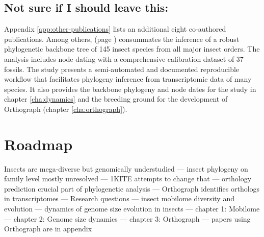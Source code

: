 \subsection{Not sure if I should leave this:}

Appendix \ref{app:other-publications} lists an additional eight
co-authored publications. Among others, \citet{Misof2014} (page
\pageref{app:Misof2014}) consummates the inference of a robust
phylogenetic backbone tree of 145 insect species from all major insect
orders. The analysis includes node dating with a comprehensive
calibration dataset of 37 fossils. The study presents a semi-automated
and documented reproducible workflow that facilitates phylogeny
inference from transcriptomic data of many species. It also provides the
backbone phylogeny and node dates for the study in chapter
\ref{cha:dynamics} and the breeding ground for the development of
Orthograph (chapter \ref{cha:orthograph}).

\section{Roadmap}

Insects are mega-diverse but genomically understudied --- insect
phylogeny on family level mostly unresolved --- 1KITE attempts to change
that --- orthology prediction crucial part of phylogenetic analysis ---
Orthograph identifies orthologs in transcriptomes --- Research questions
--- insect mobilome diversity and evolution --- dynamics of genome size
evolution in insects --- chapter 1: Mobilome --- chapter 2: Genome size
dynamics --- chapter 3: Orthograph --- papers using Orthograph are in
appendix
